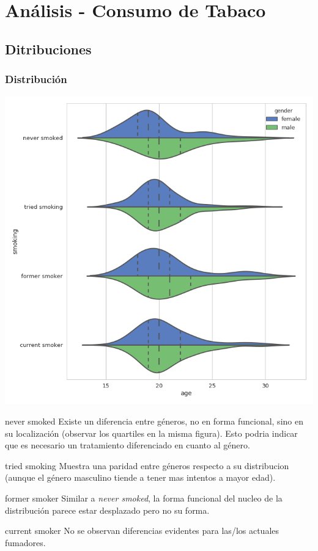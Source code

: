 \documentclass[8pt]{beamer}
\begin{document}
\section{Análisis - Consumo de Tabaco}
\subsection{Ditribuciones}
\begin{frame}\frametitle{Distribución}
\setlength{\columnsep}{80pt} 
\begin{multicols}{2}
 \begin{minipage}[t]{.6\textwidth}
\includegraphics[scale=0.25]{smoking_dist}
\end{minipage}

\begin{minipage}[t]{.4\textwidth}
\tiny{
\begin{block}{never smoked}
Existe un diferencia entre géneros, no en forma funcional, sino en su localización (observar los quartiles en la misma figura). Esto podria indicar  que es necesario un tratamiento diferenciado en cuanto al género.
\end{block}
\pause
\begin{block}{tried smoking}
Muestra una paridad entre géneros respecto a su distribucion (aunque el género masculino tiende a tener mas intentos a mayor edad).
\end{block}
\pause
\begin{block}{former smoker}
Similar a \textit{never smoked}, la forma funcional del nucleo de la distribución parece estar desplazado pero no su forma.
\end{block}
\begin{block}{current smoker}
No se observan diferencias evidentes para las/los actuales fumadores.
\end{block}
}
\end{minipage}
\end{multicols}
\end{frame}
\end{document}
